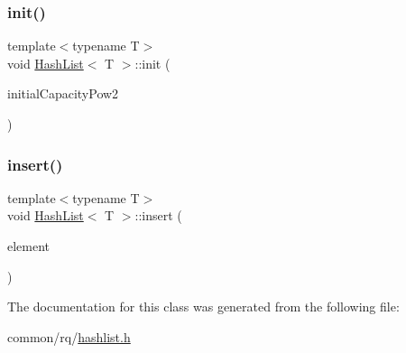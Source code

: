 \mbox{\label{classHashList_a299a7932055966f85d934a62db7e7cc5}} 
\subsubsection{\texorpdfstring{init()}{init()}}
{\footnotesize\ttfamily template$<$typename T$>$ \\
void \hyperlink{classHashList}{Hash\+List}$<$ T $>$\+::init (\begin{DoxyParamCaption}\item[{const long long}]{initial\+Capacity\+Pow2 }\end{DoxyParamCaption})\hspace{0.3cm}{\ttfamily [inline]}}

\mbox{\label{classHashList_a64d7aa6809912d1cd7c4d9865d6a16ea}} 
\subsubsection{\texorpdfstring{insert()}{insert()}}
{\footnotesize\ttfamily template$<$typename T$>$ \\
void \hyperlink{classHashList}{Hash\+List}$<$ T $>$\+::insert (\begin{DoxyParamCaption}\item[{const T \&}]{element }\end{DoxyParamCaption})\hspace{0.3cm}{\ttfamily [inline]}}



The documentation for this class was generated from the following file\+:\begin{DoxyCompactItemize}
\item 
common/rq/\hyperlink{hashlist_8h}{hashlist.\+h}\end{DoxyCompactItemize}

